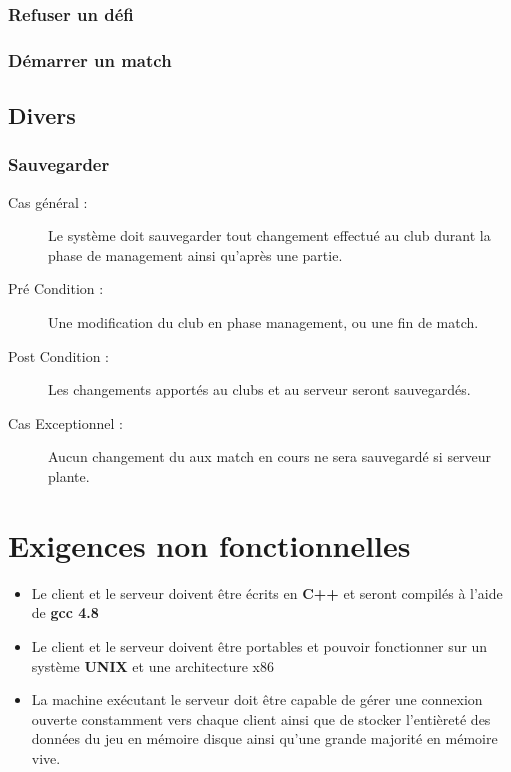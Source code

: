 \documentclass[a4paper]{report}
\begin{document}
\subsubsection{Refuser un défi}


\subsubsection{Démarrer un match}


\subsection{Divers}
\subsubsection{Sauvegarder}
\begin{description}
    \item[Cas général :] Le système doit sauvegarder tout changement effectué au \gls{club} durant la phase de management ainsi qu'après une partie.
    \item[Pré Condition  :] Une modification du \gls{club} en phase management, ou une fin de match.
    \item[Post Condition :] Les changements apportés au \glspl{club} et au \gls{serveur} seront sauvegardés.
    \item[Cas Exceptionnel :] Aucun changement du aux match en cours ne sera sauvegardé si \gls{serveur} plante.
\end{description}


\section{Exigences non fonctionnelles}
\label{enf}
\begin{itemize}
    \item Le \gls{client} et le \gls{serveur} doivent être écrits en \textbf{C++} et seront compilés à l'aide de \textbf{gcc 4.8}
    \item Le \gls{client} et le \gls{serveur} doivent être portables et pouvoir fonctionner sur un système \textbf{UNIX} et une architecture x86
    \item La machine exécutant le \gls{serveur} doit être capable de gérer une connexion ouverte constamment vers chaque \gls{client} ainsi que de stocker l'entièreté des données du jeu en mémoire disque ainsi qu'une grande majorité en mémoire vive.
\end{itemize}
\end{document}
